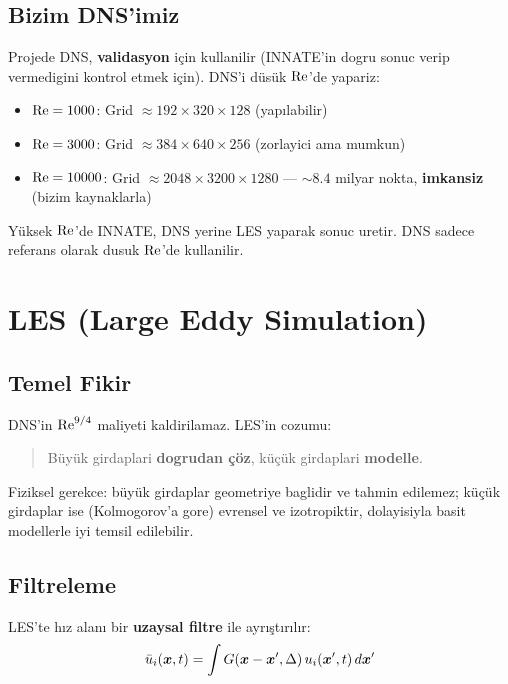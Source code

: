 \subsection{Bizim DNS'imiz}

Projede DNS, \textbf{validasyon} için kullanilir (INNATE'in dogru sonuc verip vermedigini kontrol etmek için). DNS'i düsük $\mathrm{Re}$'de yapariz:
\begin{itemize}
\item $\mathrm{Re} = 1000$: Grid $\approx 192\times320\times128$ (yapılabilir)
\item $\mathrm{Re} = 3000$: Grid $\approx 384\times640\times256$ (zorlayici ama mumkun)
\item $\mathrm{Re} = 10000$: Grid $\approx 2048\times3200\times1280$ --- $\sim8.4$ milyar nokta, \textbf{imkansiz} (bizim kaynaklarla)
\end{itemize}

Yüksek $\mathrm{Re}$'de INNATE, DNS yerine LES yaparak sonuc uretir. DNS sadece referans olarak dusuk $\mathrm{Re}$'de kullanilir.


\section{LES (Large Eddy Simulation)}
\label{sec:les}

\subsection{Temel Fikir}

DNS'in $\mathrm{Re}^{9/4}$ maliyeti kaldirilamaz. LES'in cozumu:
\begin{quote}
Büyük girdaplari \textbf{dogrudan çöz}, küçük girdaplari \textbf{modelle}.
\end{quote}

Fiziksel gerekce: büyük girdaplar geometriye baglidir ve tahmin edilemez; küçük girdaplar ise (Kolmogorov'a gore) evrensel ve izotropiktir, dolayisiyla basit modellerle iyi temsil edilebilir.

\subsection{Filtreleme}

LES'te hız alanı bir \textbf{uzaysal filtre} ile ayrıştırılır:
\begin{equation}
\bar{u}_i(\bm{x},t) = \int G(\bm{x}-\bm{x}',\Delta)\,u_i(\bm{x}',t)\,d\bm{x}'
\label{eq:les_filter}
\end{equation}

